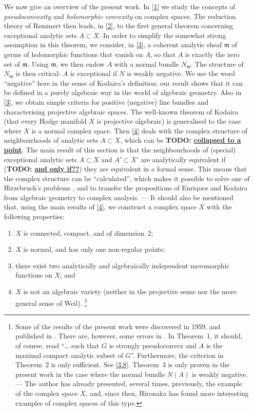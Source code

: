 \documentclass{article}
\theoremstyle{plain}
\theoremstyle{definition}
\newcommand{\fk}{\mathfrak}
\newcommand{\unsure}[1]{\textbf{TODO: \underline{#1}}}
\newcommand{\oldpage}[1]{\marginpar{\footnotesize$\Big\vert$ \textit{p.~#1}}}
\begin{document}
\oldpage{332}
We now give an overview of the present work.
In \cref{1} we study the concepts of \emph{pseudoconvexity} and \emph{holomorphic convexity} on complex spaces.
The reduction theory of Remmert then leads, in \cref{2}, to the first general theorem concerning exceptional analytic sets $A\subset X$.
In order to simplify the somewhat strong assumption in this theorem, we consider, in \cref{3}, a coherent analytic sheaf $\fk{m}$ of germs of holomorphic functions that vanish on $A$, so that $A$ is exactly the zero set of $\fk{m}$.
Using $\fk{m}$, we then endow $A$ with a normal bundle $N_\fk{m}$.
The structure of $N_\fk{m}$ is then critical: $A$ is exceptional if $N$ is weakly negative.
We use the word ``negative'' here in the sense of Kodaira's definition; our result shows that it can be defined in a purely algebraic way in the world of algebraic geometry.
Also in \cref{3}, we obtain simple criteria for positive (negative) line bundles and characterising projective algebraic spaces.
The well-known theorem of Kodaira (that every Hodge manifold $X$ is projective algebraic) is generalised to the case where $X$ is a normal complex space.
Then \cref{4} deals with the complex structure of neighbourhoods of analytic sets $A\subset X$, which can be \unsure{collapsed to a point}.
The main result of this section is that the neighbourhoods of (special) exceptional analytic sets $A\subset X$ and $A'\subset X'$ are analytically equivalent if (\unsure{and only if??}) they are equivalent in a formal sense.
This means that the complex structure can be ``calculated'', which makes it possible to solve one of Hirzebruch's problems \cite{11}, and to transfer the propositions of Enriques and Kodaira from algebraic geometry to complex analysis.
--- It should also be mentioned that, using the main results of \cref{4}, we construct a complex space $X$ with the following properties:
\begin{enumerate}[1)]
  \item $X$ is connected, compact, and of dimension~$2$;
  \item $X$ is normal, and has only one non-regular points;
  \item there exist two analytically and algebraically independent meromorphic functions on $X$; and
  \item $X$ is not an algebraic variety (neither in the projective sense nor the more general sense of Weil).%
  \footnote{
    Some of the results of the present work were discovered in 1959, and published in \cite{7}.
    There are, however, some errors in \cite{7}.
    In Theorem~1, it should, of course, read ``\ldots{} such that $G$ is strongly pseudoconvex and $A$ is the maximal compact analytic subset of $G$''.
    Furthermore, the criterion in Theorem~2 is only sufficient.
    See \cref{3.8}.
    Theorem~3 is only proven in the present work in the case where the normal bundle $N(A)$ is weakly negative.
    --- The author has already presented, several times, previously, the example of the complex space $X$, and, since then, Hironaka has found more interesting examples of complex spaces of this type.
  }
\end{enumerate}
\end{document}
